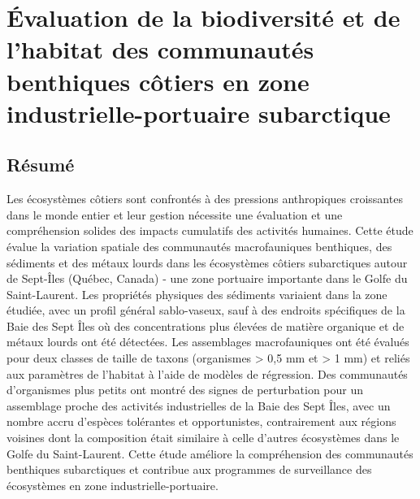 \chapter{Évaluation de la biodiversité et de l'habitat des communautés benthiques côtiers en zone industrielle-portuaire subarctique}
\label{chap1}

\section{Résumé}
Les écosystèmes côtiers sont confrontés à des pressions anthropiques croissantes dans le monde entier et leur gestion nécessite une évaluation et une compréhension solides des impacts cumulatifs des activités humaines. Cette étude évalue la variation spatiale des communautés macrofauniques benthiques, des sédiments et des métaux lourds dans les écosystèmes côtiers subarctiques autour de Sept-Îles (Québec, Canada) - une zone portuaire importante dans le Golfe du Saint-Laurent. Les propriétés physiques des sédiments variaient dans la zone étudiée, avec un profil général sablo-vaseux, sauf à des endroits spécifiques de la Baie des Sept Îles où des concentrations plus élevées de matière organique et de métaux lourds ont été détectées. Les assemblages macrofauniques ont été évalués pour deux classes de taille de taxons (organismes > 0,5 mm et > 1 mm) et reliés aux paramètres de l'habitat à l'aide de modèles de régression. Des communautés d'organismes plus petits ont montré des signes de perturbation pour un assemblage proche des activités industrielles de la Baie des Sept Îles, avec un nombre accru d'espèces tolérantes et opportunistes, contrairement aux régions voisines dont la composition était similaire à celle d'autres écosystèmes dans le Golfe du Saint-Laurent. Cette étude améliore la compréhension des communautés benthiques subarctiques et contribue aux programmes de surveillance des écosystèmes en zone industrielle-portuaire. \linebreak[4]

